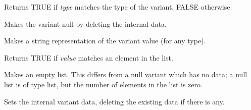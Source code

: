 Returns TRUE if {\it type} matches the type of the variant, FALSE otherwise.

\label{wxvariantmakenull}


Makes the variant null by deleting the internal data.

\label{wxvariantmakestring}


Makes a string representation of the variant value (for any type).

\label{wxvariantmember}


Returns TRUE if {\it value} matches an element in the list.

\label{wxvariantnulllist}


Makes an empty list. This differs from a null variant which has no data; a null list
is of type list, but the number of elements in the list is zero.

\label{wxvariantsetdata}


Sets the internal variant data, deleting the existing data if there is any.

\label{wxvariantassignment}










